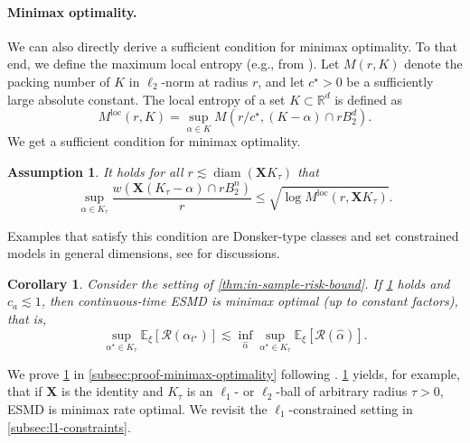 \documentclass[a4paper]{article}
\newcommand{\br}[1]{\left[#1\right]}
\newcommand{\X}[0]{\mathbf{X}}
\newcommand{\EE}[0]{\mathbb{E}}
\newcommand{\RR}[0]{\mathbb{R}}
\newcommand{\cR}[0]{\mathcal{R}}
\newcommand{\ha}[0]{\widehat{\alpha}}
\newcommand{\alphastar}{\alpha^\star}
\newcommand{\alphatstar}[0]{\alpha_{t^\star}}
\newcommand{\Kt}[0]{K_\tau}
\DeclareMathOperator{\diamOp}{diam}
\newcommand{\diam}[0]{{\diamOp}}
\DeclareMathOperator{\locOp}{loc}
\newcommand{\locEntropy}[0]{M^{\locOp}}
\theoremstyle{thmstyle}
\newtheorem{corollary}{Corollary}
\theoremstyle{defstyle}
\newtheorem{assumption}{Assumption}
\theoremstyle{remark}
\begin{document}
\paragraph{Minimax optimality.} We can also directly derive a sufficient condition for minimax optimality.
To that end, we define the maximum local entropy (e.g., from \cite{Neykov2022minimax}). Let $M(r,K)$ denote the packing number of $K$ in $\ell_2$-norm at radius $r$, and let $c^\star >0$ be a sufficiently large absolute constant. The local entropy of a set $K\subset \RR^d$ is defined as
\begin{equation*}
    \locEntropy(r,K)=\sup_{\alpha\in K} M(r/c^\star ,(K-\alpha)\cap rB_2^d).
\end{equation*}
We get a sufficient condition for minimax optimality.
\begin{assumption}
    \label{ass:local-entropy}
    It holds for all $r\lesssim \diam(\X \Kt)$ that
    \begin{equation*}
        \sup_{\alpha\in \Kt} \frac{w(\X(\Kt-\alpha) \cap rB_2^n)}{r} \leq \sqrt{\log \locEntropy(r,\X \Kt)}.
    \end{equation*}
\end{assumption}
Examples that satisfy this condition are Donsker-type classes and set constrained models in general dimensions, see \citet{han2021set,kur2019optimality} for discussions.
\begin{corollary}
\label{cor:minimax-optimality}
    Consider the setting of \cref{thm:in-sample-risk-bound}. If \cref{ass:local-entropy} holds and $c_a\lesssim 1$, then continuous-time ESMD is minimax optimal (up to constant factors), that is,
    \begin{equation*}
        \sup_{\alphastar\in \Kt} \EE_\xi \br{\cR(\alphatstar)} \lesssim \inf_{\ha} \sup_{\alphastar\in \Kt} \EE_\xi\br{\cR(\ha)}.
    \end{equation*}
\end{corollary}
We prove \cref{cor:minimax-optimality} in \cref{subsec:proof-minimax-optimality} following \citet[Cor. 2.6]{Prasadan2024some}. \cref{cor:minimax-optimality} yields, for example, that if $\X$ is the identity and $\Kt$ is an $\ell_1$- or $\ell_2$-ball of arbitrary radius $\tau>0$, ESMD is minimax rate optimal. We revisit the $\ell_1$-constrained setting in \cref{subsec:l1-constraints}.
\end{document}
